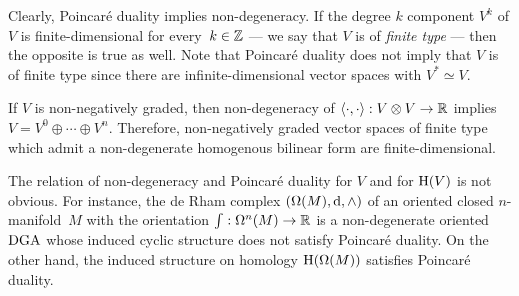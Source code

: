 \documentclass[\MainFolder/Text.tex]{subfiles}
\begin{document}
\begin{Remark}\label{Rem:NonDegPD}
\begin{RemarkList}
\item Clearly, Poincar\'e duality implies non-degeneracy. If the degree $k$ component $V^k$ of $V$ is finite-dimensional for every~$k\in \mathbb{Z}$ --- we say that $V$ is of \emph{finite type} --- then the opposite is true as well. Note that Poincar\'e duality does not imply that $V$ is of finite type since there are infinite-dimensional vector spaces with $V^* \simeq V$.
\item If $V$ is non-negatively graded, then non-degeneracy of $\langle\cdot,\cdot\rangle: V\otimes V \rightarrow \mathbb{R}$ implies $V = V^0 \oplus \dotsb \oplus V^n$. Therefore, non-negatively graded vector spaces of finite type which admit a non-degenerate homogenous bilinear form are finite-dimensional.
\item The relation of non-degeneracy and Poincar\'e duality for $V$ and for $\mathrm{H}(V)$ is not obvious. For instance, the de Rham complex $(\Omega(M),\mathrm{d},\wedge)$ of an oriented closed $n$-manifold~$M$ with the orientation $\int: \Omega^n(M) \rightarrow \mathbb{R}$ is a non-degenerate oriented $\mathrm{DGA}$ whose induced cyclic structure does not satisfy Poincar\'e duality. On the other hand, the induced structure on homology $\mathrm{H}(\Omega(M))$ satisfies Poincar\'e duality.\qedhere
\end{RemarkList}
\end{Remark}
%
\end{document}
